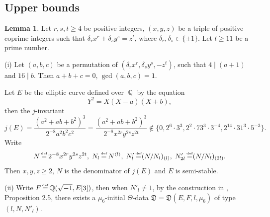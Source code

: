 \documentclass[a4paper, 12pt]{article}
\DeclareMathOperator{\defeq}{\overset{\text{\tiny{def}}}{=}}
\DeclareMathOperator{\Q}{\mathbb{Q}}
\newcommand{\lagl}{\langle l \rangle}
\numberwithin{equation}{section}
\theoremstyle{definition}
\newtheorem{lem}[thm]{Lemma}
\begin{document}
\subsection{Upper bounds}

\begin{lem}  \label{2-1-lem-1}
Let $r,s,t\ge 4$ be positive integers, $(x,y,z)$ be a triple of positive coprime integers such that $\delta_r x^r + \delta_s y^s = z^t$, where $\delta_r,\delta_s \in \{\pm 1\}$. Let $l\ge 11$ be a prime number.

(i) Let $(a,b,c)$ be a permutation of $(\delta_r x^r, \delta_s y^s, -z^t)$, such that $4\mid (a+1)$ and $16\mid b$. Then $a+b+c = 0$, $\gcd(a,b,c) = 1$.

Let $E$ be the elliptic curve defined over $\Q$ by the equation 
$$Y^2 = X(X- a)(X+ b),$$
then the $j$-invariant
$$j(E) = \frac{(a^2+ab+b^2)^3}{2^{-8}a^2b^2c^2} = \frac{(a^2+ab+b^2)^3}{2^{-8}x^{2r}y^{2s}z^{2t} } \notin \{0,2^6\cdot 3^3,2^2\cdot 73^3\cdot 3^{-4},2^{14}\cdot 31^3\cdot 5^{-3}\} .$$
Write 
$$N \defeq 2^{-8}x^{2r}y^{2s}z^{2t}, \; N_l \defeq N^{\lagl}, \; N'_l \defeq (N/N_l)_{(l)}, \;  N'_{2l} \defeq (N/N_l)_{(2l)}. $$
Then $x,y,z \ge 2$, $N$ is the denominator of $j(E)$ and $E$ is semi-stable.

(ii) Write $F\defeq \Q(\sqrt{-1}, E[3])$, then when $N'_l \neq 1$, by the construction in \cite{Diophantine_after_IUT_I}, Proposition 2.5, there exists a $\mu_6$-initial $\Theta$-data $\mathfrak D = \mathfrak D(E,F,l,\mu_6)$ of type $(l, N, N'_l)$.


\end{lem}
\end{document}
